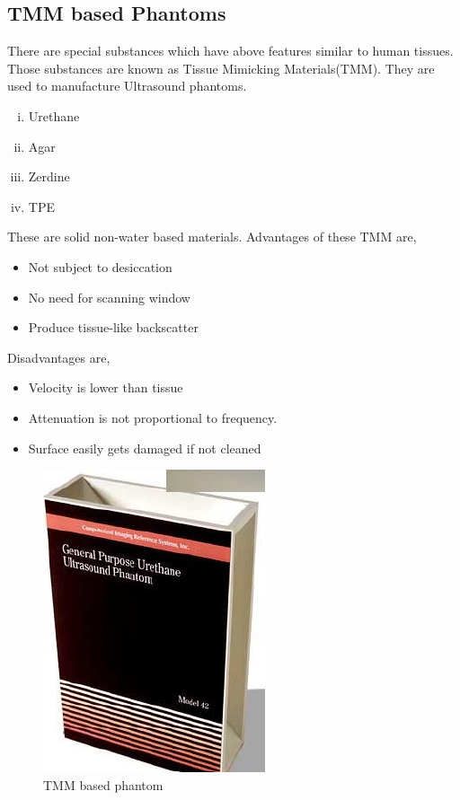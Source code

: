 \documentclass[12pt]{article}
\begin{document}
\subsection{TMM based Phantoms}
There are special substances which have above features similar to human tissues. Those substances are known as Tissue Mimicking Materials(TMM). They are used to manufacture Ultrasound phantoms. 
\begin{enumerate}[i.]
    \item Urethane
    \item Agar
    \item Zerdine
    \item TPE
\end{enumerate}
These are solid non-water based materials. Advantages of these TMM are,
\begin{itemize}
    \item Not subject to desiccation
    \item No need for scanning window
    \item Produce tissue-like backscatter
\end{itemize}
Disadvantages are,
\begin{itemize}
    \item Velocity is lower than tissue
    \item Attenuation is not proportional to frequency.
    \item Surface easily gets damaged if not cleaned
\end{itemize}

\begin{figure}[h!]
    \centering
    \includegraphics[width=0.35\linewidth]{tmm.jpg}
    \caption{\small{TMM based phantom}}
    \label{fig:TMM based phantom}
\end{figure}
\end{document}
